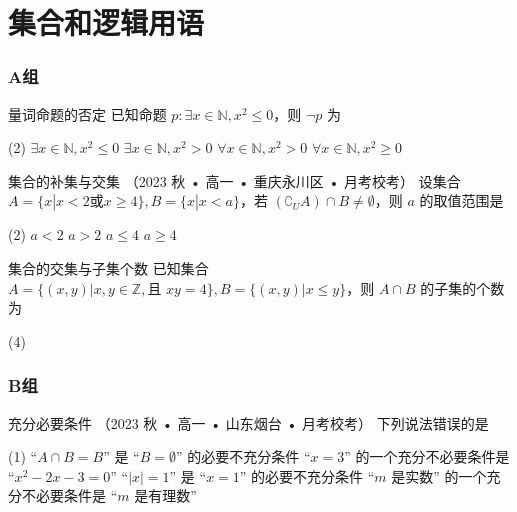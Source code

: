 \chapter{集合和逻辑用语}
\setcounter{choicecounter}{0} 

\subsection*{A组}

\begin{choice}{}{量词命题的否定}
	已知命题 $p: \exists x \in \mathbb{N}, x^2 \le 0$，则 $\neg p$ 为
	\begin{tasks}(2)
		\task $\exists x \in \mathbb{N}, x^2 \le 0$
		\task $\exists x \in \mathbb{N}, x^2 > 0$
		\task $\forall x \in \mathbb{N}, x^2 > 0$
		\task $\forall x \in \mathbb{N}, x^2 \ge 0$
	\end{tasks}
\end{choice}

\begin{choice}{}{集合的补集与交集}
	{（2023 秋 • 高一 • 重庆永川区 • 月考校考）} 设集合 $A=\{x|x<2 \text{或} x \ge 4\}, B=\{x|x<a\}$，若 $(\complement_U A) \cap B \neq \emptyset$，则 $a$ 的取值范围是
	\begin{tasks}(2)
		\task $a < 2$
		\task $a > 2$
		\task $a \le 4$
		\task $a \ge 4$
	\end{tasks}
\end{choice}

\begin{choice}{}{集合的交集与子集个数}
	已知集合 $A=\{(x,y) | x,y \in \mathbb{Z}, \text{且 } xy=4\}, B=\{(x,y) | x \le y\}$，则 $A \cap B$ 的子集的个数为
	\begin{tasks}(4)
	\end{tasks}
\end{choice}


\subsection*{B组}

\begin{choice}{}{充分必要条件}
	{（2023 秋 • 高一 • 山东烟台 • 月考校考）} 下列说法错误的是
	\begin{tasks}(1)
		\task “$A \cap B = B$” 是 “$B = \emptyset$” 的必要不充分条件
		\task “$x=3$” 的一个充分不必要条件是 “$x^2-2x-3=0$”
		\task “$|x|=1$” 是 “$x=1$” 的必要不充分条件
		\task “$m$ 是实数” 的一个充分不必要条件是 “$m$ 是有理数”
	\end{tasks}
\end{choice}

